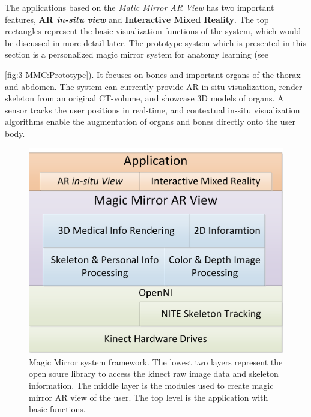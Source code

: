 The applications based on the \textit{Matic Mirror AR View} has two important features, \textbf{AR \textit{in-situ view}} and \textbf{Interactive Mixed Reality}. The top rectangles represent the basic visualization functions of the system, which would be discussed in more detail later. The prototype system which is presented in this section is a personalized magic mirror system for anatomy learning (see \figurename{\ref{fig:3-MMC:Prototype}). It focuses on bones and important organs of the thorax and abdomen. The system can currently provide AR in-situ visualization, render skeleton from an original CT-volume, and showcase 3D models of organs. A sensor tracks the user positions in real-time, and contextual in-situ visualization algorithms enable the augmentation of organs and bones directly onto the user body.
\begin{figure}
	\centering
	\caption[Magic Mirror system framework]{Magic Mirror system framework. The lowest two layers represent the open soure library to access the kinect raw image data and skeleton information. The middle layer is the modules used to create magic mirror AR view of the user. The top level is the application with basic functions.}
	\label{fig:3-MMC:systemFramework}
	\includegraphics[width = 0.7\linewidth]{figures/3-MMC/SystemFramework}
\end{figure}
}
